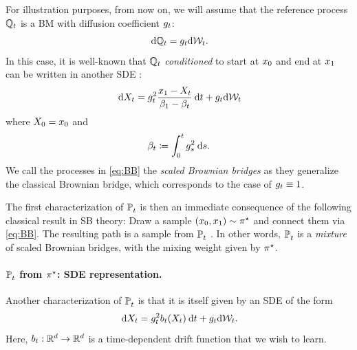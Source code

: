 For illustration purposes, from now on, we will assume that the reference process $\mathbb{Q}_{ t }$ is a \acrshort{BM} with diffusion coefficient $g_{t}$:
\begin{equation}
\label{eq:gtWt}
\dd \refpro = \volat \mathrm{d}\gW_t.
\end{equation}
In this case, it is well-known that $\mathbb{Q}_{ t }$ \emph{conditioned} to start at $x_0$ and end at $x_1$ can be written in another \acrshort{SDE} \citep{mansuy2008aspects, liu2023learning}:
\begin{equation}
\label{eq:BB}
\dd X_t = \volatsq[\ctime] \frac{\x_1-X_t}{\cvolat[\horizon]-\cvolat[\ctime]} \dt + \volat\mathrm{d}\gW_t
\end{equation}
where $X_0 = x_0$ and %
\begin{equation}
\beta_{t}\coloneqq \int_0^t g^2_{ s } \:\mathrm{d} s.
\end{equation}We call the processes in \eqref{eq:BB} the \emph{scaled Brownian bridges} as they generalize the classical Brownian bridge, which corresponds to the case of $g_{t} \equiv 1$.

The first characterization of $\mathbb{P}^{}_{ t }$ is then an immediate consequence of the following classical result in \acrlong{SB} theory: Draw a sample $(x_0, x_1) \sim \pi^\star$ and connect them via \eqref{eq:BB}. The resulting path is a sample from $\mathbb{P}^{}_{ t }$ \citep{leonard2013survey, chen2021stochastic}. In other words, $\mathbb{P}^{}_{ t }$ is a \emph{mixture} of scaled Brownian bridges, with the mixing weight given by $\pi^\star$.

\paragraph{$\mathbb{P}^{}_{ t }$ from $\pi^\star$: SDE representation.}

Another characterization of $\mathbb{P}^{}_{ t }$ is that it is itself given by an \acrshort{SDE} of the form \citep{leonard2013survey, chen2021stochastic}
\begin{equation}
\label{eq:SB-SDE}
\dd X_t = \volatsq[\ctime]\fdrift(X_t) \dt + \volat\mathrm{d}\gW_t.
\end{equation}
Here, $b_t: \mathbb{R}^d \to \mathbb{R}^d$ is a time-dependent drift function that we wish to learn.

